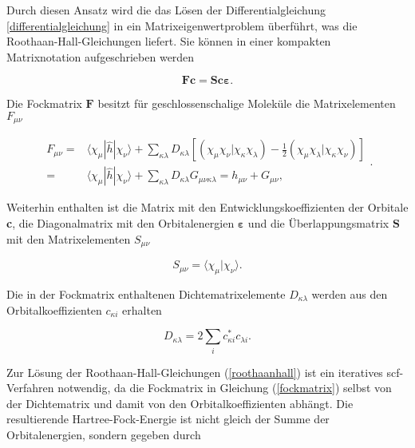 Durch diesen Ansatz wird die das Lösen der Differentialgleichung \ref{differentialgleichung} in ein Matrixeigenwertproblem überführt, was die Roothaan-Hall-Gleichungen\supercite{roothaanhall} liefert. Sie können in einer kompakten Matrixnotation aufgeschrieben werden

\begin{equation}\label{roothaanhall}
\boldsymbol{Fc}=\boldsymbol{Sc\varepsilon}.
\end{equation}

Die Fockmatrix $\boldsymbol{F}$ besitzt für geschlossenschalige Moleküle die Matrixelementen $F_{\mu\nu}$

\begin{equation}
\begin{aligned}
F_{\mu\nu} =& \langle\chi_{\mu}|\hat{h}|\chi_{\nu}\rangle + \sum_{\kappa\lambda}D_{\kappa\lambda}\left[\left(\chi_{\mu}\chi_{\nu}|\chi_{\kappa}\chi_{\lambda}\right)-\frac{1}{2}\left(\chi_{\mu}\chi_{\lambda}|\chi_{\kappa}\chi_{\nu}\right)\right]\\
=&\langle\chi_{\mu}|\hat{h}|\chi_{\nu}\rangle + \sum_{\kappa\lambda}D_{\kappa\lambda}G_{\mu\nu\kappa\lambda}=h_{\mu\nu}+G_{\mu\nu},
\end{aligned}.
\label{fockmatrix}
\end{equation}

Weiterhin enthalten ist die Matrix mit den Entwicklungskoeffizienten der Orbitale \textbf{c}, die Diagonalmatrix mit den Orbitalenergien $\boldsymbol{\varepsilon}$ und die Überlappungsmatrix $\boldsymbol{S}$ mit den Matrixelementen $S_{\mu\nu}$

\begin{equation}
S_{\mu\nu}=\langle\chi_{\mu}|\chi_{\nu}\rangle.
\end{equation}

Die in der Fockmatrix enthaltenen Dichtematrixelemente $D_{\kappa\lambda}$ werden aus den Orbitalkoeffizienten $c_{\kappa i}$ erhalten

\begin{equation}
D_{\kappa\lambda}=2\sum_{i} c_{\kappa i}^* c_{\lambda i}.
\end{equation}

Zur Lösung der Roothaan-Hall-Gleichungen (\ref{roothaanhall}) ist ein iteratives \ac{scf}-Verfahren notwendig, da die Fockmatrix in Gleichung (\ref{fockmatrix}) selbst von der Dichtematrix und damit von den Orbitalkoeffizienten abhängt. Die resultierende Hartree-Fock-Energie ist nicht gleich der Summe der Orbitalenergien, sondern gegeben durch


